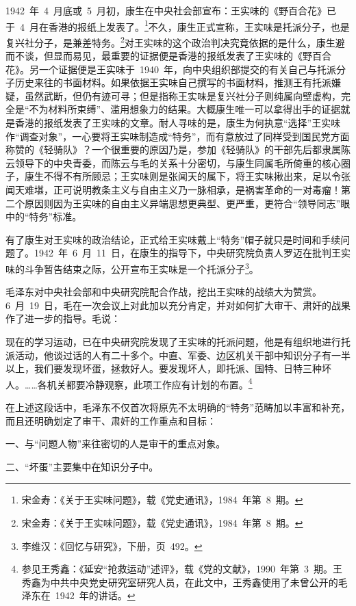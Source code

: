 1942~年~4~月底或~5~月初，康生在中央社会部宣布：王实味的《野百合花》已于~4~月在香港的报纸上发表了。\footnote{宋金寿：《关于王实味问题》，载《党史通讯》，1984~年第~8~期。}不久，康生正式宣称，王实味是托派分子，也是复兴社分子，是兼差特务。\footnote{宋金寿：《关于王实味问题》，载《党史通讯》，1984~年第~8~期。}对王实味的这个政治判决究竟依据的是什么，康生避而不谈，但显而易见，最重要的证据便是香港的报纸发表了王实味的《野百合花》。另一个证据便是王实味于~1940~年，向中央组织部提交的有关自己与托派分子历史来往的书面材料。如果依据王实味自己撰写的书面材料，推测王有托派嫌疑，虽然武断，但仍有迹可寻；但是指称王实味是复兴社分子则纯属向壁虚构，完全是“不为材料所束缚”、滥用想象力的结果。大概康生唯一可以拿得出手的证据就是香港的报纸发表了王实味的文章。耐人寻味的是，康生为何执意“选择”王实味作“调查对象”，一心要将王实味制造成“特务”，而有意放过了同样受到国民党方面称赞的《轻骑队》？一个很重要的原因乃是，参加《轻骑队》的干部先后都隶属陈云领导下的中央青委，而陈云与毛的关系十分密切，与康生同属毛所倚重的核心圈子，康生不得不有所顾忌；王实味则是张闻天的属下，将王实味揪出来，足以令张闻天难堪，正可说明教条主义与自由主义乃一脉相承，是祸害革命的一对毒瘤！第二个原因则因为王实味的自由主义异端思想更典型、更严重，更符合“领导同志”眼中的“特务”标准。

有了康生对王实味的政治结论，正式给王实味戴上“特务”帽子就只是时间和手续问题了。1942~年~6~月~11~日，在康生的指导下，中央研究院负责人罗迈在批判王实味的斗争暂告结束之际，公开宣布王实味是一个托派分子\footnote{李维汉：《回忆与研究》，下册，页~492。}。

毛泽东对中央社会部和中央研究院配合作战，挖出王实味的战绩大为赞赏。6~月~19~日，毛在一次会议上对此加以充分肯定，并对如何扩大审干、肃奸的战果作了进一步的指导。毛说：

\begin{quoting}
现在的学习运动，已在中央研究院发现了王实味的托派问题，他是有组织地进行托派活动，他谈过话的人有二十多个。中直、军委、边区机关干部中知识分子有一半以上，我们要发现坏蛋，拯救好人。要发现坏人，即托派、国特、日特三种坏人。……各机关都要冷静观察，此项工作应有计划的布置。\footnote{参见王秀鑫：《延安“抢救运动”述评》，载《党的文献》，1990~年第~3~期。王秀鑫为中共中央党史研究室研究人员，在此文中，王秀鑫使用了未曾公开的毛泽东在~1942~年的讲话。}
\end{quoting}

在上述这段话中，毛泽东不仅首次将原先不太明确的“特务”范畴加以丰富和补充，而且还明确划定了审干、肃奸的工作重点和目标：

一、与“问题人物”来往密切的人是审干的重点对象。

二、“坏蛋”主要集中在知识分子中。

